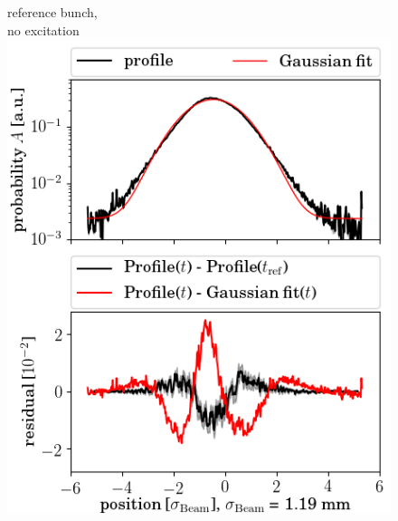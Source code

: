 \documentclass[%
 reprint,
 amsmath,amssymb,
 aps,
prstab,
]{revtex4-1}
\begin{document}
\begin{figure}[h]
	\begin{minipage}[t]{0.49\linewidth}
		\centering
		reference bunch,\\ no excitation
		\includegraphics[width=1.0\linewidth]{profile_h_8thh_slot_804.png}
	\end{minipage}
	\begin{minipage}[t]{0.49\linewidth}
		\centering

\end{minipage}
\end{figure}
\end{document}
